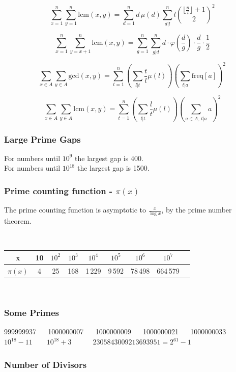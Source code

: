 $$\sum_{x = 1}^n \sum_{y = 1}^n \text{lcm}(x, y)
= \sum_{d = 1}^n d \, \mu(d) \sum_{d|l}^{n} l \binom{\lfloor \frac{n}{l} \rfloor + 1}{2}^2$$

$$\sum_{x = 1}^n \sum_{y = x+1}^n \text{lcm}(x, y) = \sum_{g = 1}^n \sum_{g|d}^n d \cdot \varphi\left(\frac{d}{g}\right) \cdot \frac{d}{g} \cdot \frac 1 2$$

$$\sum_{x \in A} \sum_{y \in A} \text{gcd}(x, y)
= \sum_{t = 1}^n \left(\sum_{l | t} \frac{t}{l} \mu(l)\right) \left(\sum_{t|a} \text{freq}[a]\right)^2$$

$$\sum_{x \in A} \sum_{y \in A} \text{lcm}(x, y)
= \sum_{t = 1}^n \left(\sum_{l | t} \frac{l}{t} \mu(l)\right) \left(\sum_{a \in A, \, t|a} a\right)^2$$

\subsubsection{Large Prime Gaps}
For numbers until $10^9$ the largest gap is 400.\\
For numbers until $10^{18}$ the largest gap is 1500.\\[0.5cm]

\subsubsection{Prime counting function - \texorpdfstring{$\pi(x)$}{}} The prime counting function is asymptotic to $\frac{x}{\log x}$, by the prime number theorem.

\

\begin{tabular}{|c|c|c|c|c|c|c|c|c|}
\hline
  \cellcolor{gray!40} x&10&$10^2$&$10^3$&$10^4$&$10^5$&$10^6$&$10^7$\\ \hline
  \cellcolor{gray!40} $\pi(x)$& 4 & 25 & 168 & 1\,229 & 9\,592 & 78\,498 & 664\,579\\ \hline
\end{tabular}

\

\subsubsection{Some Primes}

999999937 $\quad$ 1000000007 $\quad$ 1000000009 $\quad$ 1000000021 $\quad$ 1000000033
$10^{18} - 11 \quad\quad 10^{18} + 3 \quad\quad\quad 2305843009213693951 = 2^{61} - 1$

\subsubsection{Number of Divisors}

